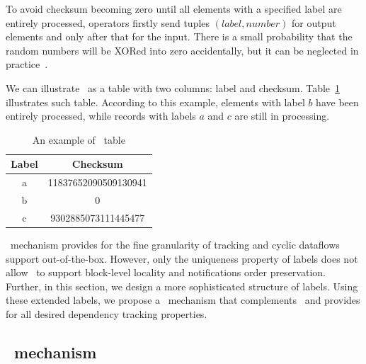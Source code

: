 To avoid checksum becoming zero until all elements with a specified label are entirely processed, operators firstly send tuples $(label, number)$ for output elements and only after that for the input. There is a small probability that the random numbers will be XORed into zero accidentally, but it can be neglected in practice~\cite{apache:storm:acker}.

We can illustrate \acker\ as a table with two columns: label and checksum. Table~\ref{ack_table} illustrates such table. According to this example, elements with label $b$ have been entirely processed, while records with labels $a$ and $c$ are still in processing.

\begin{table}
\caption{An example of \acker\ table}
    \begin{center}
        \begin{tabular}{ |c|c| } 
         \hline
         Label & Checksum \\ 
         \hline
         a & 11837652090509130941 \\ 
         b & 0 \\
         c & 9302885073111445477 \\
         \hline
        \end{tabular}
    \end{center}
\label{ack_table}
\end{table}

\acker\ mechanism provides for the fine granularity of tracking and cyclic dataflows support out-of-the-box. However, only the uniqueness property of labels does not allow \acker\ to support block-level locality and notifications order preservation. Further, in this section, we design a more sophisticated structure of labels. Using these extended labels, we propose a \tracker\ mechanism that complements \acker\ and provides for all desired dependency tracking properties. 

\subsection{\tracker\ mechanism}

 

